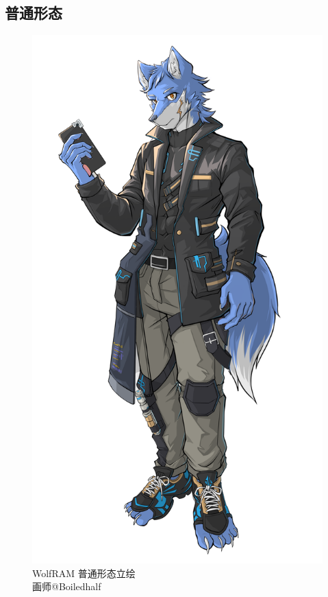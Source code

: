 \documentclass[lang=cn,newtx,10pt,scheme=chinese]{elegantbook}
\newcommand{\wf}{WolfRAM}
\begin{document}
\subsection{普通形态}
\noindent
\begin{figure}[H]
    \begin{minipage}[c]{0.48\textwidth}
        \centering
        \includegraphics[width=\linewidth]{wolfram/normal.png} %
        \caption{\wf{} 普通形态立绘\\\centering 画师@Boiledhalf}

\end{minipage}
\end{figure}
\end{document}
